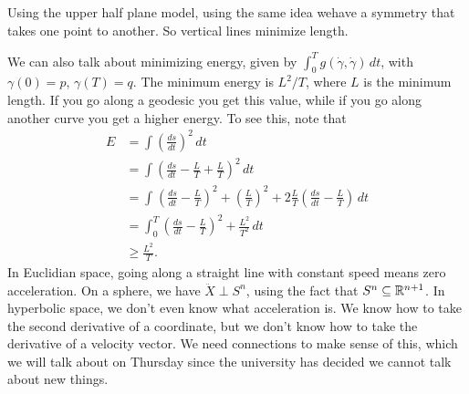 Using the upper half plane model, using the same idea wehave a symmetry that takes one point to another. So vertical lines minimize length.

We can also talk about minimizing energy, given by $\int_{0}^{T} g(\dot \gamma , \dot \gamma ) \, dt$, with $\gamma (0)=p$, $\gamma (T)=q$. The minimum energy is $L^2 /T$, where $L$ is the minimum length. If you go along a geodesic you get this value, while if you go along another curve you get a higher energy. To see this, note that 
\begin{align*}
    E &= \int \left( \frac{ds}{dt} \right) ^2 \, dt\\
      &= \int \left( \frac{ds}{dt}-\frac{L}{T}+\frac{L}{T} \right) ^2 \, dt\\
      &= \int_{}^{} \left( \frac{ds}{dt}-\frac{L}{T} \right) ^2+\left( \frac{L}{T} \right) ^2 + 2 \frac{L}{T}\left( \frac{ds}{dt}-\frac{L}{T} \right)  \, dt\\
      &= \int_{0}^{T} \left( \frac{ds}{dt}-\frac{L}{T} \right) ^2+ \frac{L^2}{T^2} \, dt\\
      &\geq \frac{L^2}{T}.
\end{align*}
In Euclidian space, going along a straight line with constant speed means zero acceleration. On a sphere, we have $\ddot X \perp S^n $, using the fact that $S^n  \subseteq \mathbb{R}^{n+1}$. In hyperbolic space, we don't even know what acceleration is. We know how to take the second derivative of a coordinate, but we don't know how to take the derivative of a velocity vector. We need connections to make sense of this, which we will talk about on Thursday since the university has decided we cannot talk about new things.

